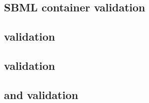 \begin{sbmlenum}
\end{sbmlenum} \subsection*{} \begin{sbmlenum}

\begin{blockChanged}


\end{blockChanged}

\end{sbmlenum} \subsection*{SBML container validation} \begin{sbmlenum}


\end{sbmlenum} \subsection*{ validation} \begin{sbmlenum}


\end{sbmlenum} \subsection*{ validation} \begin{sbmlenum}


\end{sbmlenum} \subsection*{ and  validation} \begin{sbmlenum}



\end{sbmlenum}
